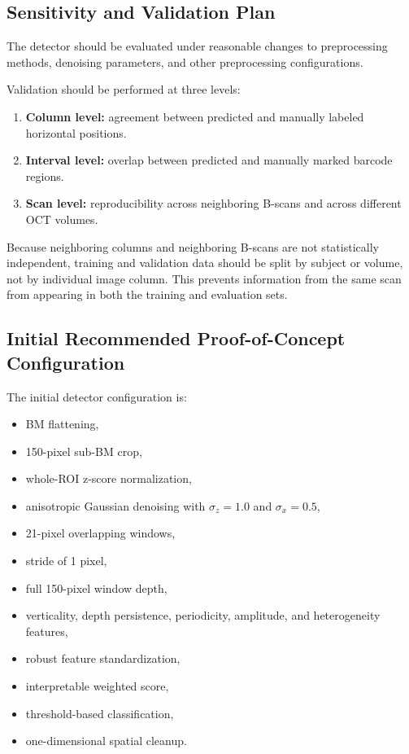 \documentclass[11pt]{article}
\begin{document}
\subsection{Sensitivity and Validation Plan}

The detector should be evaluated under reasonable changes to preprocessing methods, denoising parameters, and other preprocessing configurations.

Validation should be performed at three levels:

\begin{enumerate}
    \item \textbf{Column level:} agreement between predicted and manually
    labeled horizontal positions.
    \item \textbf{Interval level:} overlap between predicted and manually
    marked barcode regions.
    \item \textbf{Scan level:} reproducibility across neighboring B-scans and
    across different OCT volumes.
\end{enumerate}

Because neighboring columns and neighboring B-scans are not statistically
independent, training and validation data should be split by subject or volume,
not by individual image column. This prevents information from the same scan
from appearing in both the training and evaluation sets.


\subsection{Initial Recommended Proof-of-Concept Configuration}

The initial detector configuration is:

\begin{itemize}
    \item BM flattening,
    \item 150-pixel sub-BM crop,
    \item whole-ROI z-score normalization,
    \item anisotropic Gaussian denoising with
    \(\sigma_z=1.0\) and \(\sigma_x=0.5\),
    \item 21-pixel overlapping windows,
    \item stride of 1 pixel,
    \item full 150-pixel window depth,
    \item verticality, depth persistence, periodicity, amplitude, and
    heterogeneity features,
    \item robust feature standardization,
    \item interpretable weighted score,
    \item threshold-based classification,
    \item one-dimensional spatial cleanup.
\end{itemize}
\end{document}
